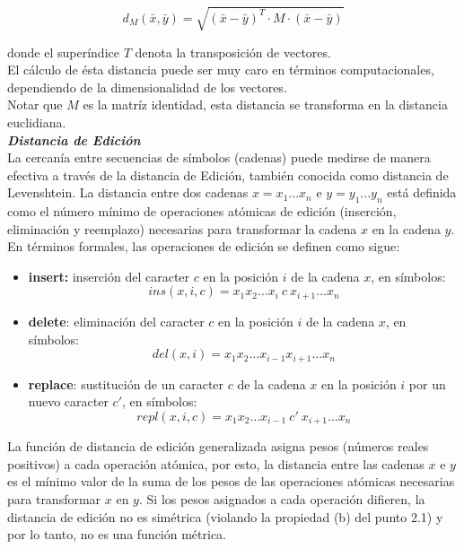 \[
d_M(\bar{x},\bar{y}) = \sqrt{(\bar{x} - \bar{y})^T \cdot M \cdot (\bar{x} - \bar{y})}
\]

\noindent donde el super\'indice $T$ denota la transposici\'on de vectores.\\

El c\'alculo de \'esta distancia puede ser muy caro en t\'erminos computacionales, dependiendo de la dimensionalidad de los vectores.\\

Notar que $M$ es la matr\'iz identidad, esta distancia se transforma en la distancia euclidiana.\\

\noindent \textbf{\textit{Distancia de Edici\'on}}\\

La cercan\'ia entre secuencias de s\'imbolos (cadenas) puede medirse de manera efectiva a trav\'es de la distancia de Edici\'on, tambi\'en conocida como distancia de Levenshtein. La distancia entre dos cadenas $x=x_1...x_n$ e $y=y_1...y_n$ est\'a definida como el n\'umero m\'inimo de operaciones at\'omicas de edici\'on (inserci\'on, eliminaci\'on y reemplazo) necesarias para transformar la cadena $x$ en la cadena $y$. En t\'erminos formales, las operaciones de edici\'on se definen como sigue:

\begin{itemize}
\item \textbf{insert:} inserci\'on del caracter $c$ en la posici\'on $i$ de la cadena $x$, en s\'imbolos: 
  \[ins(x,i,c)=x_1 x_2 \ldots x_i\ c\ x_{i+1} \ldots x_n\]
\item  \textbf{delete}: eliminaci\'on del caracter $c$ en la posici\'on $i$ de la cadena $x$, en s\'imbolos:
  \[del(x,i)=x_1 x_2 \ldots x_{i-1} x_{i+1} \ldots x_n\]
\item \textbf{replace}: sustituci\'on de un caracter $c$ de la cadena $x$ en la posici\'on $i$ por un nuevo caracter $c'$, en s\'imbolos:
  \[repl(x,i,c)=x_1 x_2 \ldots x_{i-1}\ c' \ x_{i+1} \ldots x_n\]
\end{itemize}


La funci\'on de distancia de edici\'on generalizada asigna pesos (n\'umeros reales positivos) a cada operaci\'on at\'omica, por esto, la distancia entre las cadenas $x$ e $y$ es el m\'inimo valor de la suma de los pesos de las operaciones at\'omicas necesarias para transformar $x$ en $y$. Si los pesos asignados a cada operaci\'on difieren, la distancia de edici\'on no es sim\'etrica (violando la propiedad (b) del punto 2.1) y por lo tanto, no es una funci\'on m\'etrica.\\

